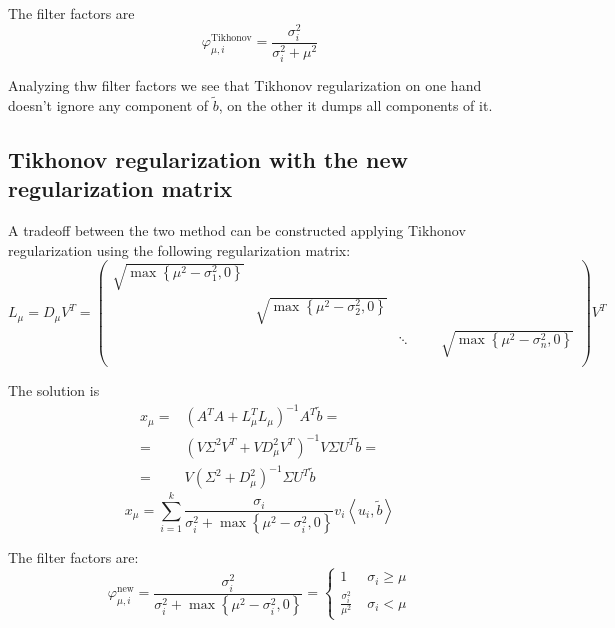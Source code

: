 \documentclass[a4paper,10pt]{article}
\theoremstyle{plain}
\theoremstyle{definition}
\theoremstyle{remark}
\newcommand{\set}[1]{\left\{#1\right\}}
\newcommand{\pa}[1]{\left(#1\right)}
\newcommand{\ang}[1]{\left<#1\right>}
\begin{document}
The filter factors are
\begin{equation}
  \label{eq:tikfilter}
  \varphi ^{\text{Tikhonov}} _{\mu,i} = \frac{\sigma _i ^2}{\sigma _i
    ^2 + \mu ^2}
\end{equation}

Analyzing thw filter factors we see that Tikhonov regularization on
one hand doesn't ignore any component of $\tilde b$, on the other it
dumps all components of it.

\subsection{Tikhonov regularization with the new regularization matrix}

A tradeoff between the two method can be constructed applying Tikhonov
regularization using the following regularization matrix:
\begin{equation*}
  \label{eq:modtikL}
  L_\mu = D _\mu V^T =
  \begin{pmatrix}
    \sqrt{\max\set{\mu ^2 - \sigma _1 ^2,0}} \\
    & \sqrt{\max\set{\mu ^2 - \sigma _2 ^2,0}} \\
    & & \ddots
    & & & \sqrt{\max\set{\mu ^2 - \sigma _n ^2,0}} \\
  \end{pmatrix}
  V^T
\end{equation*}

The solution is
\begin{align*}
  x_\mu =& \pa{ A^T A + L_\mu^T L_\mu }^{-1} A^T \tilde b = \\
  = & \pa{ V \Sigma ^2 V^T + V D_\mu ^2 V^T} ^{-1} V\Sigma U^T \tilde
  b = \\
  = & V \pa{ \Sigma ^2 + D_\mu ^2 } ^{-1} \Sigma U^T \tilde b
\end{align*}
\begin{equation}
  \label{eq:modtikx}
  x_\mu  = \sum _{i=1} ^k \frac{\sigma _i}{\sigma _i ^2 + \max\set{
      \mu ^2 - \sigma _i ^2 ,0}  }  v_i \ang{u_i,\tilde b}
\end{equation}

The filter factors are:
\begin{equation}
  \label{eq:modtikfilter}
  \varphi ^{\text{new}} _{\mu,i} = \frac{\sigma _i ^2}{\sigma _i ^2 + \max\set{
      \mu ^2 - \sigma _i ^2 ,0}  } = \left\{
  \begin{matrix}
    1\; & \sigma _i \ge \mu \\
    \frac{\sigma _i ^2}{\mu ^2} \; & \sigma _i < \mu
  \end{matrix}
  \right.
\end{equation}
\end{document}
